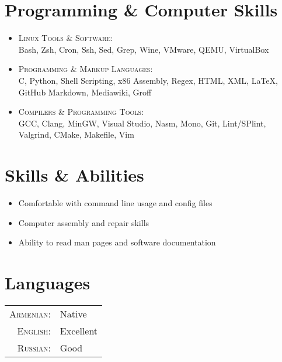 \documentclass[a4paper,10pt]{article}
\begin{document}
\section{Programming \& Computer Skills}
\begin{itemize}
\item \textsc{Linux Tools \& Software}:\\
	Bash, Zsh, Cron, Ssh, Sed, Grep, Wine, VMware, QEMU, VirtualBox
\item \textsc{Programming \& Markup Languages}:\\
	C, Python, Shell Scripting, x86 Assembly, Regex,
	HTML, XML, \LaTeX, GitHub Markdown, Mediawiki, Groff
\item \textsc{Compilers \& Programming Tools}:\\
	GCC, Clang, MinGW, Visual Studio, Nasm, Mono,
	Git, Lint/SPlint, Valgrind, CMake, Makefile, Vim
\end{itemize}

\section{Skills \& Abilities}
\begin{itemize}
\item Comfortable with command line usage and config files
\item Computer assembly and repair skills
\item Ability to read man pages and software documentation
\end{itemize}

\section{Languages}
\begin{tabular}{r l}
\textsc{Armenian}: & Native\\
\textsc{English}: & Excellent\\
\textsc{Russian}: & Good
\end{tabular}
\end{document}
